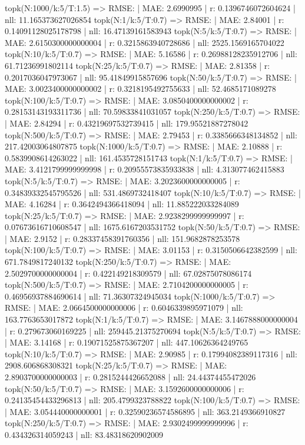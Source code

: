 topk(N:1000/k:5/T:1.5) => RMSE: | MAE: 2.6990995 | r: 0.1396746072604624 | nll: 11.165373627026854
topk(N:1/k:5/T:0.7) => RMSE: | MAE: 2.84001 | r: 0.14091128025178798 | nll: 16.47139161583943
topk(N:5/k:5/T:0.7) => RMSE: | MAE: 2.6150300000000004 | r: 0.3215863940728686 | nll: 2525.1569165704022
topk(N:10/k:5/T:0.7) => RMSE: | MAE: 5.16586 | r: 0.26988128235912706 | nll: 61.71236991802114
topk(N:25/k:5/T:0.7) => RMSE: | MAE: 2.81358 | r: 0.2017036047973067 | nll: 95.41849915857696
topk(N:50/k:5/T:0.7) => RMSE: | MAE: 3.0023400000000002 | r: 0.3218195492755633 | nll: 52.4685171089278
topk(N:100/k:5/T:0.7) => RMSE: | MAE: 3.0850400000000002 | r: 0.28153143193311736 | nll: 70.59833841031057
topk(N:250/k:5/T:0.7) => RMSE: | MAE: 2.84294 | r: 0.43219697532739415 | nll: 179.95521887278042
topk(N:500/k:5/T:0.7) => RMSE: | MAE: 2.79453 | r: 0.3385666348134852 | nll: 217.42003064807875
topk(N:1000/k:5/T:0.7) => RMSE: | MAE: 2.10888 | r: 0.5839908614263022 | nll: 161.4535728151743
topk(N:1/k:5/T:0.7) => RMSE: | MAE: 3.4121799999999998 | r: 0.20955573835933838 | nll: 4.313077462415883
topk(N:5/k:5/T:0.7) => RMSE: | MAE: 3.2023600000000005 | r: 0.34839332545795526 | nll: 531.4869732418407
topk(N:10/k:5/T:0.7) => RMSE: | MAE: 4.16284 | r: 0.3642494366418094 | nll: 11.885222033284089
topk(N:25/k:5/T:0.7) => RMSE: | MAE: 2.9238299999999997 | r: 0.07673616710608547 | nll: 1675.6167203531752
topk(N:50/k:5/T:0.7) => RMSE: | MAE: 2.9152 | r: 0.28337458391760356 | nll: 151.9682878253578
topk(N:100/k:5/T:0.7) => RMSE: | MAE: 3.01153 | r: 0.3150506642382599 | nll: 671.7849817240132
topk(N:250/k:5/T:0.7) => RMSE: | MAE: 2.5029700000000004 | r: 0.422149218309579 | nll: 67.02875078086174
topk(N:500/k:5/T:0.7) => RMSE: | MAE: 2.7104200000000005 | r: 0.46956937884690614 | nll: 71.36307324945034
topk(N:1000/k:5/T:0.7) => RMSE: | MAE: 2.0664500000000006 | r: 0.6046339895971079 | nll: 163.7763653017872
topk(N:1/k:5/T:0.7) => RMSE: | MAE: 3.1467888000000004 | r: 0.279673060169225 | nll: 259445.21375270694
topk(N:5/k:5/T:0.7) => RMSE: | MAE: 3.14168 | r: 0.19071525875367207 | nll: 447.10626364249765
topk(N:10/k:5/T:0.7) => RMSE: | MAE: 2.90985 | r: 0.17994082389117316 | nll: 2908.606868308321
topk(N:25/k:5/T:0.7) => RMSE: | MAE: 2.8903700000000003 | r: 0.2815244426652088 | nll: 24.44374455472026
topk(N:50/k:5/T:0.7) => RMSE: | MAE: 3.1592600000000006 | r: 0.24135454433296813 | nll: 205.4799323788822
topk(N:100/k:5/T:0.7) => RMSE: | MAE: 3.054440000000001 | r: 0.32590236574586895 | nll: 363.2149366910827
topk(N:250/k:5/T:0.7) => RMSE: | MAE: 2.9302499999999996 | r: 0.434326314059243 | nll: 83.48318620902009
